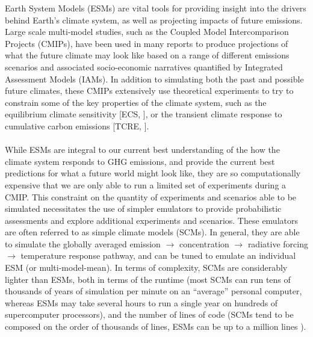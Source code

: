 \documentclass[gmd, manuscript]{copernicus}
\begin{document}
\introduction  %
Earth System Models (ESMs) are vital tools for providing insight into the drivers behind Earth’s climate system, as well as projecting impacts of future emissions. Large scale multi-model studies, such as the Coupled Model Intercomparison Projects (CMIPs), have been used in many reports to produce projections of what the future climate may look like based on a range of different emissions scenarios and associated socio-economic narratives quantified by Integrated Assessment Models (IAMs). In addition to simulating both the past and possible future climates, these CMIPs extensively use theoretical experiments to try to constrain some of the key properties of the climate system, such as the equilibrium climate sensitivity [ECS, \cite{Collins2013}], or the transient climate response to cumulative carbon emissions [TCRE, \cite{Allen2009}].\\\\ 
While ESMs are integral to our current best understanding of the how the climate system responds to GHG emissions, and provide the current best predictions for what a future world might look like, they are so computationally expensive that we are only able to run a limited set of experiments during a CMIP. This constraint on the quantity of experiments and scenarios able to be simulated necessitates the use of simpler emulators to provide probabilistic assessments and explore additional experiments and scenarios. These emulators are often referred to as simple climate models (SCMs). In general, they are able to simulate the globally averaged emission $\rightarrow$ concentration $\rightarrow$ radiative forcing $\rightarrow$ temperature response pathway, and can be tuned to emulate an individual ESM (or multi-model-mean). In terms of complexity, SCMs are considerably lighter than ESMs, both in terms of the runtime (most SCMs can run tens of thousands of years of simulation per minute on an ``average'' personal computer, whereas ESMs may take several hours to run a single year on hundreds of supercomputer processors), and the number of lines of code (SCMs tend to be composed on the order of thousands of lines, ESMs can be up to a million lines \citep{Alexander2015}).\\\\
\end{document}
